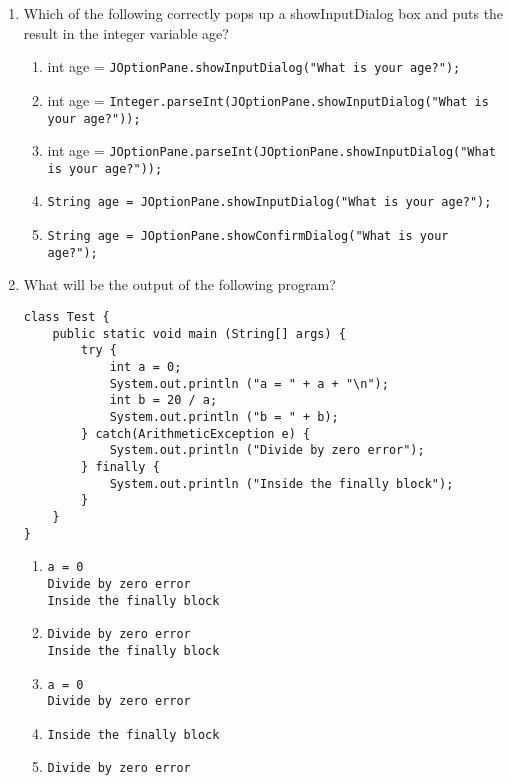 \documentclass[CS180-S16-FinalExam.tex]{subfiles}
\begin{document}
\begin{enumerate}
\item Which of the following correctly pops up a showInputDialog box and puts the result in
the integer variable age?
\begin{enumerate}
\item int age = \texttt{JOptionPane.showInputDialog("What is your age?");}
\item int age =  \texttt{Integer.parseInt(JOptionPane.showInputDialog("What is your age?"));} \ifdraft \Ans \fi
\item int age =  \texttt{JOptionPane.parseInt(JOptionPane.showInputDialog("What is your age?"));} 
\item  \texttt{String age = JOptionPane.showInputDialog("What is your age?");}
\item  \texttt{String age = JOptionPane.showConfirmDialog("What is your age?");}
\end{enumerate}

\clearpage
\item What will be the output of the following program?
\begin{lstlisting}
class Test {
    public static void main (String[] args) {
        try {
            int a = 0;
            System.out.println ("a = " + a + "\n");
            int b = 20 / a;
            System.out.println ("b = " + b);
        } catch(ArithmeticException e) {
            System.out.println ("Divide by zero error");
        } finally {
            System.out.println ("Inside the finally block");
        }
    }
}
\end{lstlisting}

\begin{enumerate}
\item \texttt{a = 0}\\ \texttt{Divide by zero error}\\ \texttt{Inside the finally block} \ifdraft \Ans \fi
\item \texttt{Divide by zero error}\\ \texttt{Inside the finally block}
\item \texttt{a = 0}\\ \texttt{Divide by zero error}
\item \texttt{Inside the finally block}
\item \texttt{Divide by zero error}\\
\end{enumerate}


\end{enumerate}
\end{document}
